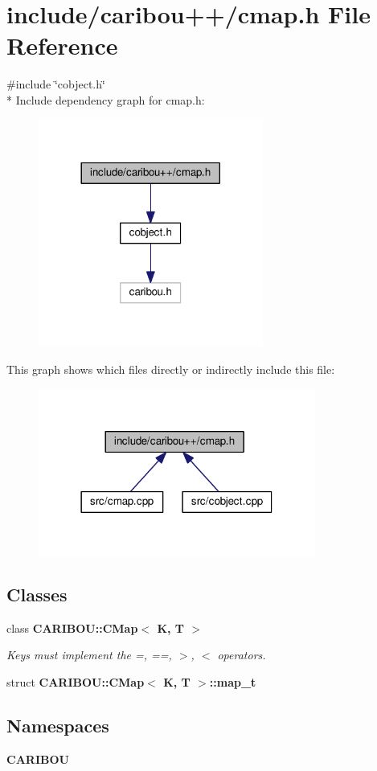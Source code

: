 \section{include/caribou++/cmap.h File Reference}
\label{cmap_8h}
{\ttfamily \#include \char`\"{}cobject.\+h\char`\"{}}\\*
Include dependency graph for cmap.\+h\+:
\nopagebreak
\begin{figure}[H]
\begin{center}
\leavevmode
\includegraphics[width=209pt]{cmap_8h__incl}
\end{center}
\end{figure}
This graph shows which files directly or indirectly include this file\+:
\nopagebreak
\begin{figure}[H]
\begin{center}
\leavevmode
\includegraphics[width=258pt]{cmap_8h__dep__incl}
\end{center}
\end{figure}
\subsection*{Classes}
\begin{DoxyCompactItemize}
\item 
class {\bf C\+A\+R\+I\+B\+O\+U\+::\+C\+Map$<$ K, T $>$}
\begin{DoxyCompactList}\small\item\em Keys must implement the =, ==, $>$, $<$ operators. \end{DoxyCompactList}\item 
struct {\bf C\+A\+R\+I\+B\+O\+U\+::\+C\+Map$<$ K, T $>$\+::map\+\_\+t}
\end{DoxyCompactItemize}
\subsection*{Namespaces}
\begin{DoxyCompactItemize}
\item 
 {\bf C\+A\+R\+I\+B\+OU}
\end{DoxyCompactItemize}
